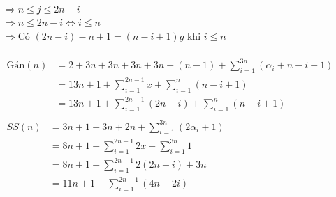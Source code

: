 \documentclass[12pt, letterpaper]{article}
\begin{document}
 \\
$\Rightarrow n \leq j \leq 2n - i$ \\
$\Rightarrow n \leq 2n - i \Leftrightarrow i \leq n$ \\
$\Rightarrow \text{Có } (2n - i) - n + 1 = (n - i + 1)g \text{ khi } i \leq n$\\
 \\
$ \begin{aligned}
	\text{Gán}(n) & = 2 + 3n + 3n + 3n + 3n + (n - 1) + \sum^{3n}_{i = 1} (\alpha_i + n - i + 1)\\
		& = 13n + 1 + \sum^{2n-1}_{i = 1} x + \sum^{n}_{i = 1} (n - i + 1) \\
		& = 13n + 1 + \sum^{2n-1}_{i = 1} (2n - i) + \sum^{n}_{i = 1} (n - i + 1) \\
\end{aligned} $ \\
$ \begin{aligned}
	SS(n) & = 3n + 1 + 3n + 2n + \sum^{3n}_{i = 1} (2 \alpha_i + 1) \\
		& = 8n + 1 +\sum^{2n-1}_{i = 1} 2x + \sum^{3n}_{i = 1} 1 \\
		& = 8n + 1 +\sum^{2n-1}_{i = 1} 2(2n - i) + 3n \\
		& = 11n + 1 +\sum^{2n-1}_{i = 1} (4n - 2i) \\
\end{aligned} $ \\
\end{document}
